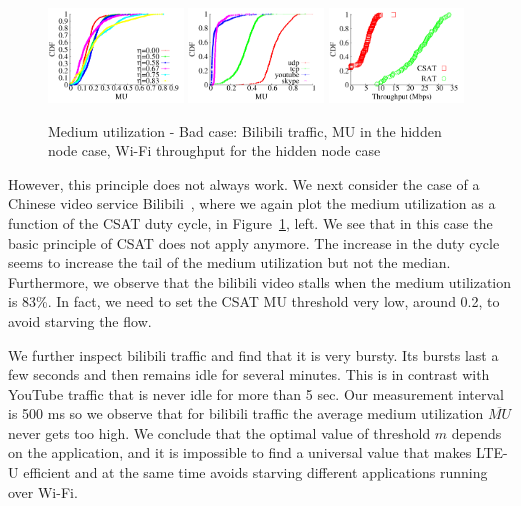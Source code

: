 \begin{figure}[htb!]
 \centering
    \includegraphics[width=0.32\textwidth]{./figures/bilibili_80211bg}
    \includegraphics[width=0.32\textwidth]{./figures/hidden_mu_applications}
    \includegraphics[width=0.32\textwidth]{./figures/hiddencase.pdf}
 \caption{Medium utilization - Bad case: Bilibili traffic, MU in the hidden node case, Wi-Fi throughput for the hidden node case}
  \label{fig:csat_mu_bad}
\vspace{-12pt}
\end{figure}

However, this principle does not always work. 
We next consider the case of a Chinese video service Bilibili~\cite{bilibili}, where we again plot the medium utilization as a function of the CSAT duty cycle, in Figure~\ref{fig:csat_mu_bad}, left. 
We see that in this case the basic principle of CSAT does not apply anymore. 
The increase in the duty cycle seems to increase the tail of the medium utilization but not the median. 
Furthermore, we observe that the bilibili video stalls when the medium utilization is 83\%.
In fact, we need to set the CSAT MU threshold very low, around 0.2, to avoid starving the flow. 

We further inspect bilibili traffic and find that it is very bursty. Its bursts last a few seconds and then remains idle for several minutes. This is in contrast with YouTube traffic that is never idle for more than 5 sec. Our measurement interval is 500 ms so we observe that for bilibili traffic the average medium utilization $\overline{MU}$ never gets too high. We conclude that the optimal value of threshold $m$ depends on the application, and it is impossible to find a universal value that makes LTE-U efficient and at the same time avoids starving different applications running over Wi-Fi.

